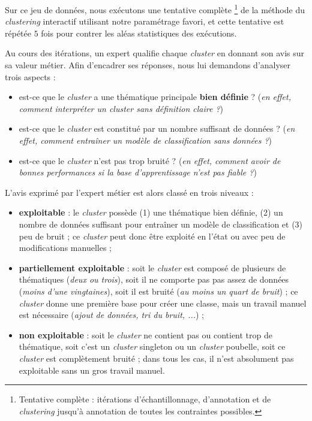 			Sur ce jeu de données, nous exécutons une tentative complète
			\footnote{Tentative complète : itérations d'échantillonnage, d'annotation et de \textit{clustering} jusqu'à annotation de toutes les contraintes possibles.}
			de la méthode du \textit{clustering} interactif utilisant notre paramétrage favori, et cette tentative est répétée $5$ fois pour contrer les aléas statistiques des exécutions.
			
			Au cours des itérations, un expert qualifie chaque \textit{cluster} en donnant son avis sur sa valeur métier.
			Afin d'encadrer ses réponses, nous lui demandons d'analyser trois aspects :
			\begin{itemize}
				\item est-ce que le \textit{cluster} a une thématique principale \textbf{bien définie} ? (\textit{en effet, comment interpréter un cluster sans définition claire ?})
				\item est-ce que le \textit{cluster} est constitué par un nombre suffisant de données ? (\textit{en effet, comment entraîner un modèle de classification sans données ?})
				\item est-ce que le \textit{cluster} n'est pas trop bruité ? (\textit{en effet, comment avoir de bonnes performances si la base d'apprentissage n'est pas fiable ?})
			\end{itemize}
			
			L'avis exprimé par l'expert métier est alors classé en trois niveaux :
			\begin{itemize}
				\item \textbf{exploitable} : le \textit{cluster} possède (1) une thématique bien définie, (2) un nombre de données suffisant pour entraîner un modèle de classification et (3) peu de bruit ; ce \textit{cluster} peut donc être exploité en l'état ou avec peu de modifications manuelles ;
				\item \textbf{partiellement exploitable} : soit le \textit{cluster} est composé de plusieurs de thématiques (\textit{deux ou trois}), soit il ne comporte pas pas assez de données (\textit{moins d'une vingtaines}), soit il est bruité (\textit{au moins un quart de bruit}) ; ce \textit{cluster} donne une première base pour créer une classe, mais un travail manuel est nécessaire (\textit{ajout de données, tri du bruit, ...}) ;
				\item \textbf{non exploitable} : soit le \textit{cluster} ne contient pas ou contient trop de thématique, soit c'est un \textit{cluster} singleton ou un \textit{cluster} poubelle, soit ce \textit{cluster} est complètement bruité ; dans tous les cas, il n'est absolument pas exploitable sans un gros travail manuel.
			\end{itemize}
			
